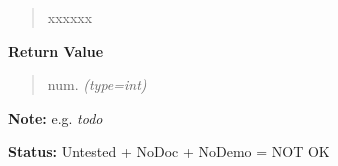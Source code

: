 \begin{boxedminipage}{\funcwidth}
\begin{quote}
\begin{Ventry}{xxxxxx}
        \end{Ventry}

      \end{quote}

      \textbf{Return Value}
    \vspace{-1ex}

      \begin{quote}

num.
      {\it (type=int)}

      \end{quote}

\textbf{Note:} 
e.g. \emph{todo}


\textbf{Status:} 
Untested + NoDoc + NoDemo = NOT OK


    \end{boxedminipage}

    \label{xformslib:flflimage:flimage_replace_pixel}

    \vspace{0.5ex}

